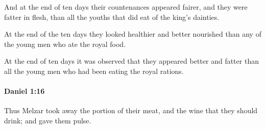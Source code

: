 			\begin{versebox}
					\item[BHS] 
					\item[LXX] 
					\item[ASV] And at the end of ten days their countenances appeared fairer, and they were fatter in flesh, than all the youths that did eat of the king's dainties.
					\item[NIV] At the end of the ten days they looked healthier and better nourished than any of the young men who ate the royal food.
					\item[NRSV] At the end of ten days it was observed that they appeared better and fatter than all the young men who had been eating the royal rations.
			\end{versebox}

		\paragraph{Daniel 1:16} %
			\label{DANIEL-1-16}

			Thus Melzar took away the portion of their meat, and the wine that they should drink; and gave them pulse.

